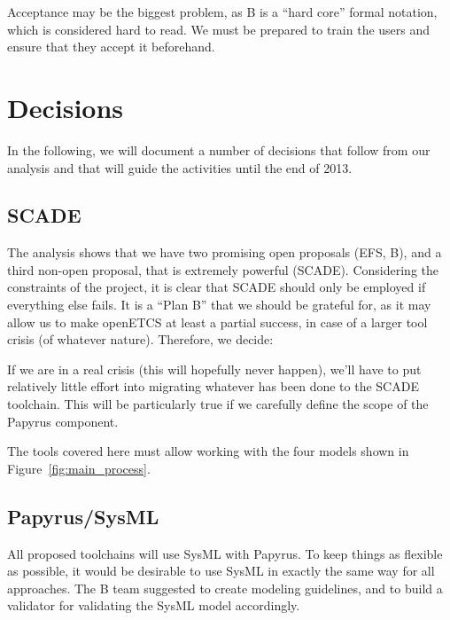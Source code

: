 Acceptance may be the biggest problem, as B is a ``hard core'' formal notation, which is considered hard to read.  We must be prepared to train the users and ensure that they accept it beforehand.

\section{Decisions}

In the following, we will document a number of decisions that follow from our analysis and that will guide the activities until the end of 2013.

\subsection{SCADE}

The analysis shows that we have two promising open proposals (EFS, B), and a third non-open proposal, that is extremely powerful (SCADE).  Considering the constraints of the project, it is clear that SCADE should only be employed if everything else fails.  It is a ``Plan B'' that we should be grateful for, as it may allow us to make openETCS at least a partial success, in case of a larger tool crisis (of whatever nature).  Therefore, we decide:



If we are in a real crisis (this will hopefully never happen), we'll have to put relatively little effort into migrating whatever has been done to the SCADE toolchain.  This will be particularly true if we carefully define the scope of the Papyrus component.

The tools covered here must allow working with the four models shown in Figure~\ref{fig:main_process}.

\subsection{Papyrus/SysML}

All proposed toolchains will use SysML with Papyrus.  To keep things as flexible as possible, it would be desirable to use SysML in exactly the same way for all approaches.  The B team suggested to create modeling guidelines, and to build a validator for validating the SysML model accordingly.

